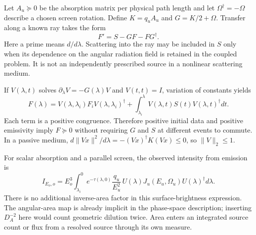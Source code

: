 Let $A_u\succeq0$ be the absorption matrix per physical path length and let $\Omega^\dagger=-\Omega$ describe a chosen screen rotation. Define $K=q_uA_u$ and $G=K/2+\Omega$. Transfer along a known ray takes the form
\begin{equation}\label{vii:transfer}
F'=S-GF-FG^\dagger.
\end{equation}
Here a prime means $d/d\lambda$. Scattering into the ray may be included in $S$ only when its dependence on the angular radiation field is retained in the coupled problem. It is not an independently prescribed source in a nonlinear scattering medium.

If $V(\lambda,t)$ solves $\partial_\lambda V=-G(\lambda)V$ and $V(t,t)=I$, variation of constants yields
\begin{equation}\label{vii:positive_duhamel}
F(\lambda)=V(\lambda,\lambda_i)F_iV(\lambda,\lambda_i)^\dagger
+\int_{\lambda_i}^{\lambda}V(\lambda,t)S(t)V(\lambda,t)^\dagger dt.
\end{equation}
Each term is a positive congruence. Therefore positive initial data and positive emissivity imply $F\succeq0$ without requiring $G$ and $S$ at different events to commute. In a passive medium, $d\|Vx\|^2/d\lambda=-(Vx)^\dagger K(Vx)\le0$, so $\|V\|_2\le1$.

For scalar absorption and a parallel screen, the observed intensity from emission is
\begin{equation}\label{vii:line_intensity}
I_{E_o,o}=E_o^3\int_{\lambda_i}^{0}
e^{-\tau(\lambda,0)}\frac{q_u}{E_u^2}\,U(\lambda)J_u(E_u,\Omega_u)U(\lambda)^\dagger d\lambda.
\end{equation}
There is no additional inverse-area factor in this surface-brightness expression. The angular-area map is already implicit in the phase-space description; inserting $D_A^{-2}$ here would count geometric dilution twice. Area enters an integrated source count or flux from a resolved source through its own measure.

